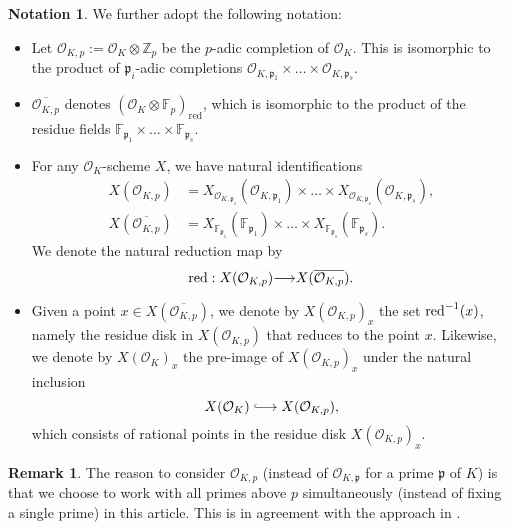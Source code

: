 \documentclass[11pt,oneside]{amsart}
\theoremstyle{plain}
\theoremstyle{definition}
\newtheorem{remark}[theorem]{Remark}
\newtheorem{notation}[theorem]{Notation}
\def\lra{{\longrightarrow}}
\def\Z{\mathbb{Z}}
\def\F{\mathbb{F}}
\def\oh{\mathcal{O}}
\def\longhookrightarrow{\lhook\joinrel\longrightarrow}
\begin{document}
\begin{notation} \label{OKp-OKP-points}
We further adopt the following notation: 
\begin{itemize}
    \item Let $\oh_{K, p}:= \oh_{K}\otimes \Z_p$ be the $p$-adic completion of $\oh_K$. %
    This is isomorphic to the product of $\mathfrak{p}_i$-adic completions $ \oh_{K,\mathfrak{p}_1} \times \ldots \times \oh_{K,\mathfrak{p}_s}.$
    \item $\overline{\oh_{K,p}}$ denotes $(\oh_K \otimes \mathbb{F}_p)_{\mathrm{red}}$, which is isomorphic to the product of the residue fields ${ \mathbb{F}_{\mathfrak{p}_1}\times \ldots \times \mathbb{F}_{\mathfrak{p}_s}}.$
    \item   For any $\oh_K$-scheme $X$, we have natural identifications
    \begin{align*}
    X(\oh_{K, p}) &= X_{\oh_{K,\mathfrak{p}_1}}(\oh_{K,\mathfrak{p}_1}) \times \ldots \times X_{\oh_{K,\mathfrak{p}_s}}(\oh_{K,\mathfrak{p}_s}), \\
    X(\overline{\oh_{K, p}}) & =  X_{\F_{\mathfrak{p}_1}}(\F_{\mathfrak{p}_1}) \times \ldots \times X_{\F_{\mathfrak{p}_s}}(\F_{\mathfrak{p}_s}).
    \end{align*}
    We denote the natural reduction map by 
    $$ \textup{red}: X(\oh_{K, p})\lra X(\overline{\oh_{K, p}}).$$  
   \item     Given a point $x\in X(\overline{\oh_{K, p}})$, we denote by $X(\oh_{K, p})_x$ the set $\textup{red}^{-1} (x)$, 
  namely the residue disk in $X(\oh_{K, p})$ that reduces to the point $x$. Likewise, we denote by $X(\oh_K)_x$ the pre-image of $X(\oh_{K, p})_x$ under the natural inclusion 
  $$ X(\oh_K) \longhookrightarrow X(\oh_{K, p}),$$
  which consists of rational points in the residue disk $X(\oh_{K, p})_x$. 
      \end{itemize}
 \end{notation}
   
 \begin{remark} \label{remark: all_primes}
The reason to consider $\oh_{K, p}$ (instead of $\oh_{K, \mathfrak p}$ for a prime $\mathfrak p$ of $K$) is that we choose to work with all primes above $p$ simultaneously (instead of fixing a single prime) in this article. This is in agreement with the approach in \cite{siksek}.  
 \end{remark}   
  
\end{document}
